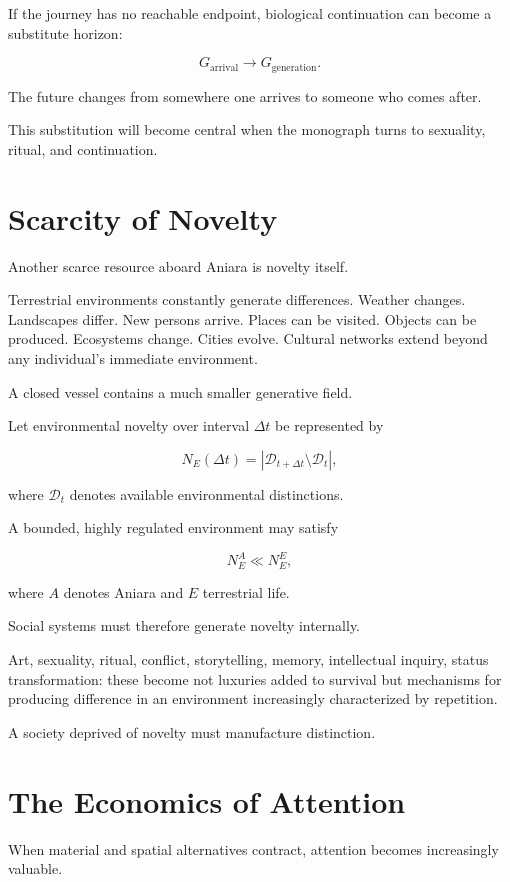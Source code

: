 \documentclass[11pt,oneside]{book}
\theoremstyle{definition}
\theoremstyle{remark}
\newcommand{\D}{\mathcal{D}}
\begin{document}
If the journey has no reachable endpoint, biological continuation can become a substitute horizon:

\[
G_{\mathrm{arrival}}
\rightarrow
G_{\mathrm{generation}}.
\]

The future changes from somewhere one arrives to someone who comes after.

This substitution will become central when the monograph turns to sexuality, ritual, and continuation.

\section{Scarcity of Novelty}

Another scarce resource aboard Aniara is novelty itself.

Terrestrial environments constantly generate differences. Weather changes. Landscapes differ. New persons arrive. Places can be visited. Objects can be produced. Ecosystems change. Cities evolve. Cultural networks extend beyond any individual's immediate environment.

A closed vessel contains a much smaller generative field.

Let environmental novelty over interval \(\Delta t\) be represented by

\[
N_E(\Delta t)
=
|\D_{t+\Delta t}\setminus\D_t|,
\]

where \(\D_t\) denotes available environmental distinctions.

A bounded, highly regulated environment may satisfy

\[
N_E^{A}
\ll
N_E^{E},
\]

where \(A\) denotes Aniara and \(E\) terrestrial life.

Social systems must therefore generate novelty internally.

Art, sexuality, ritual, conflict, storytelling, memory, intellectual inquiry, status transformation: these become not luxuries added to survival but mechanisms for producing difference in an environment increasingly characterized by repetition.

A society deprived of novelty must manufacture distinction.

\section{The Economics of Attention}

When material and spatial alternatives contract, attention becomes increasingly valuable.
\end{document}
